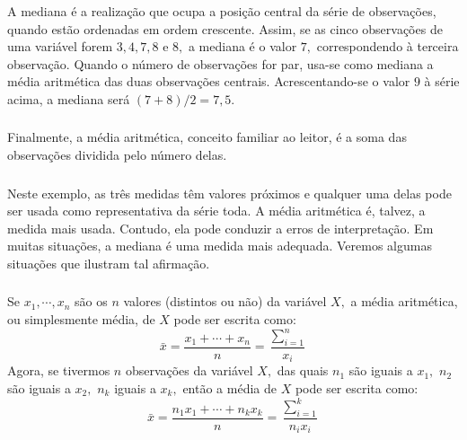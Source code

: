 \documentclass[14pt,aspectratio=1610]{beamer}
\newcommand{\bx}{\ensuremath{\bar{x}}}
\begin{document}
\begin{frame}{}
\frametitle{}
\begin{block}{}
\justifying
A mediana é a realização que ocupa a posição central da série de observações, quando
estão ordenadas em ordem crescente. Assim, se as cinco observações de uma variável forem $3, 4, 7, 8$ e $8,$ a mediana é o valor $7,$ correspondendo à terceira 
observação. Quando o número de observações for par, usa-se como mediana a média aritmética das duas observações centrais. Acrescentando-se o valor $9$ à série acima, a mediana será $(7 + 8)/2 = 7,5.$
\end{block}
\end{frame}

\begin{frame}{}
\frametitle{}
\begin{block}{}
\justifying
Finalmente, a média aritmética, conceito familiar ao leitor, é a soma das observações dividida pelo número delas.
\end{block}
\end{frame}

\begin{frame}{}
\frametitle{}
\begin{block}{}
\justifying
Neste exemplo, as três medidas têm valores próximos e qualquer uma delas pode ser
usada como representativa da série toda. A média aritmética é, talvez, a medida mais usada.
Contudo, ela pode conduzir a erros de interpretação. Em muitas situações, a mediana é uma
medida mais adequada. Veremos algumas situações que ilustram tal afirmação.
\end{block}
\end{frame}

\begin{frame}{}
\frametitle{}
\begin{block}{}
\justifying
Se $x_{1},\cdots,x_{n}$ são os $n$ valores (distintos ou não) da variável $X,$ a média aritmética, ou simplesmente média, de $X$ pode ser escrita como:
\begin{equation}
\bx=\dfrac{x_{1}+\cdots+x_{n}}{n}=\dfrac{\displaystyle \sum_{i=1}^{n}}{x_{i}}
\end{equation}
Agora, se tivermos $n$ observações da variável $X,$ das quais $n_{1}$ são iguais a $x_{1},$ $n_{2}$ são iguais
a $x_{2},$ $n_{k}$ iguais a $x_{k},$ então a média de $X$ pode ser escrita como:
\begin{equation}
\bx=\dfrac{n_{1}x_{1}+\cdots+n_{k}x_{k}}{n}=\dfrac{\displaystyle \sum_{i=1}^{k}}{n_{i}x_{i}}
\end{equation}
\end{block}
\end{frame}
\end{document}
